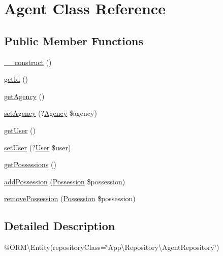 \hypertarget{class_app_1_1_entity_1_1_agent}{}\section{Agent Class Reference}
\label{class_app_1_1_entity_1_1_agent}
\subsection*{Public Member Functions}
\begin{DoxyCompactItemize}
\item 
\mbox{\hyperlink{class_app_1_1_entity_1_1_agent_a095c5d389db211932136b53f25f39685}{\+\_\+\+\_\+construct}} ()
\item 
\mbox{\hyperlink{class_app_1_1_entity_1_1_agent_a12251d0c022e9e21c137a105ff683f13}{get\+Id}} ()
\item 
\mbox{\hyperlink{class_app_1_1_entity_1_1_agent_a96f4e373af162c8fbc86093ec24f4340}{get\+Agency}} ()
\item 
\mbox{\hyperlink{class_app_1_1_entity_1_1_agent_aba5066bf731ebfd1dad6e18f82feef38}{set\+Agency}} (?\mbox{\hyperlink{class_app_1_1_entity_1_1_agency}{Agency}} \$agency)
\item 
\mbox{\hyperlink{class_app_1_1_entity_1_1_agent_ae81b7186fb97a7c6457edcc68c9aa2ef}{get\+User}} ()
\item 
\mbox{\hyperlink{class_app_1_1_entity_1_1_agent_a406a111868b45aad6d4c8ab5b0c5bcb9}{set\+User}} (?\mbox{\hyperlink{class_app_1_1_entity_1_1_user}{User}} \$user)
\item 
\mbox{\hyperlink{class_app_1_1_entity_1_1_agent_ac4cac51c734a24a84655cd6294ff4afb}{get\+Possessions}} ()
\item 
\mbox{\hyperlink{class_app_1_1_entity_1_1_agent_a5188d786a9c3e2f2936d783276947acc}{add\+Possession}} (\mbox{\hyperlink{class_app_1_1_entity_1_1_possession}{Possession}} \$possession)
\item 
\mbox{\hyperlink{class_app_1_1_entity_1_1_agent_a720a2c7cb1ff271659d4ca746e29ca47}{remove\+Possession}} (\mbox{\hyperlink{class_app_1_1_entity_1_1_possession}{Possession}} \$possession)
\end{DoxyCompactItemize}


\subsection{Detailed Description}
@\+O\+RM\textbackslash{}\+Entity(repository\+Class=\char`\"{}\+App\textbackslash{}\+Repository\textbackslash{}\+Agent\+Repository\char`\"{}) 

